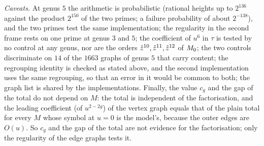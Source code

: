 \emph{Caveats.} At genus $5$ the arithmetic is probabilistic (rational heights up to $2^{136}$ against the product $2^{150}$ of the two primes; a failure probability of about $2^{-138}$), and the two primes test the same implementation; the regularity in the second frame rests on one prime at genus $3$ and $5$; the coefficient of $u^6$ in $\tau$ is tested by no control at any genus, nor are the orders $\hat{z}^{10},\hat{z}^{11},\hat{z}^{12}$ of $M_{0}$; the two controls discriminate on $14$ of the $1663$ graphs of genus $5$ that carry content; the regrouping identity is checked as stated above, and the second implementation uses the same regrouping, so that an error in it would be common to both; the graph list is shared by the implementations. Finally, the value $c_g$ and the gap of the total do not depend on $M$: the total is independent of the factorisation, and the leading coefficient (of $u^{2-2g}$) of the vertex graph equals that of the plain total for every $M$ whose symbol at $u=0$ is the model's, because the outer edges are $O(u)$. So $c_g$ and the gap of the total are not evidence for the factorisation; only the regularity of the edge graphs tests it.


